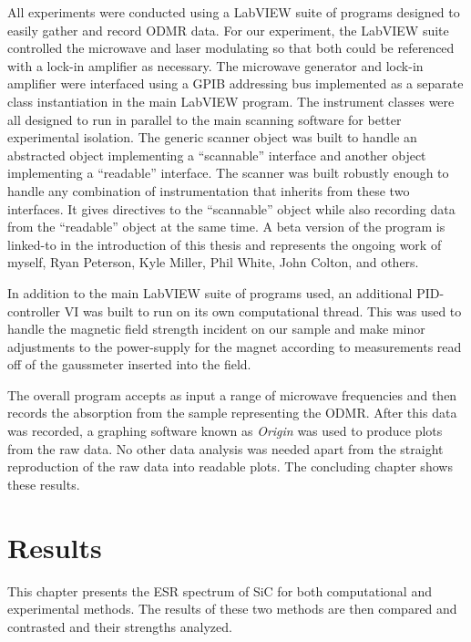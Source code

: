 \documentclass[oneside]{BYUPhys}
\begin{document}
All experiments were conducted using a LabVIEW suite of programs designed to easily gather and record ODMR data. For our experiment, the LabVIEW suite controlled the microwave and laser modulating so that both could be referenced with a lock-in amplifier as necessary. The microwave generator and lock-in amplifier were interfaced using a GPIB addressing bus implemented as a separate class instantiation in the main LabVIEW program. The instrument classes were all designed to run in parallel to the main scanning software for better experimental isolation. The generic scanner object was built to handle an abstracted object implementing a ``scannable'' interface and another object implementing a ``readable'' interface. The scanner was built robustly enough to handle any combination of instrumentation that inherits from these two interfaces. It gives directives to the ``scannable'' object while also recording data from the ``readable'' object at the same time. A beta version of the program is linked-to in the introduction of this thesis and represents the ongoing work of myself, Ryan Peterson, Kyle Miller, Phil White, John Colton, and others.

In addition to the main LabVIEW suite of programs used, an additional PID-controller VI was built to run on its own computational thread. This was used to handle the magnetic field strength incident on our sample and make minor adjustments to the power-supply for the magnet according to measurements read off of the gaussmeter inserted into the field.

The overall program accepts as input a range of microwave frequencies and then records the absorption from the sample representing the ODMR. After this data was recorded, a graphing software known as \textit{Origin} was used to produce plots from the raw data. No other data analysis was needed apart from the straight reproduction of the raw data into readable plots. The concluding chapter shows these results.










\chapter{Results}

This chapter presents the ESR spectrum of SiC for both computational and experimental methods. The results of these two methods are then compared and contrasted and their strengths analyzed.
\end{document}
